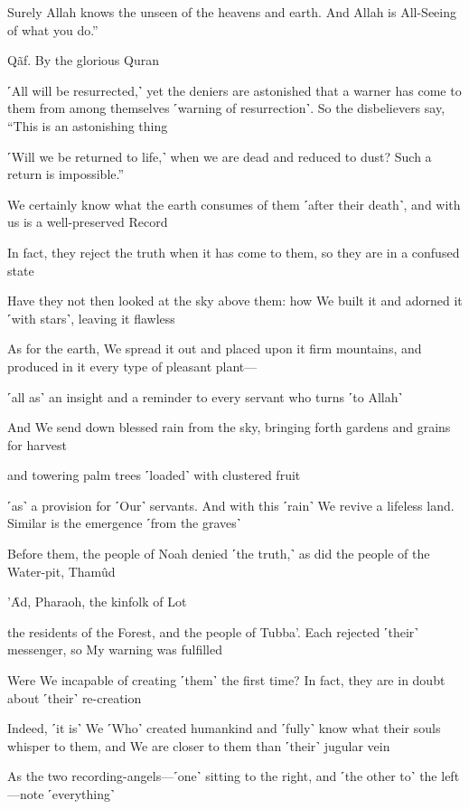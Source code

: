 Surely Allah knows the unseen of the heavens and earth. And Allah is All-Seeing of what you do.”

Qãf. By the glorious Quran

˹All will be resurrected,˺ yet the deniers are astonished that a warner has come to them from among themselves ˹warning of resurrection˺. So the disbelievers say, “This is an astonishing thing

˹Will we be returned to life,˺ when we are dead and reduced to dust? Such a return is impossible.”

We certainly know what the earth consumes of them ˹after their death˺, and with us is a well-preserved Record

In fact, they reject the truth when it has come to them, so they are in a confused state

Have they not then looked at the sky above them: how We built it and adorned it ˹with stars˺, leaving it flawless

As for the earth, We spread it out and placed upon it firm mountains, and produced in it every type of pleasant plant—

˹all as˺ an insight and a reminder to every servant who turns ˹to Allah˺

And We send down blessed rain from the sky, bringing forth gardens and grains for harvest

and towering palm trees ˹loaded˺ with clustered fruit

˹as˺ a provision for ˹Our˺ servants. And with this ˹rain˺ We revive a lifeless land. Similar is the emergence ˹from the graves˺

Before them, the people of Noah denied ˹the truth,˺ as did the people of the Water-pit, Thamûd

’Ȃd, Pharaoh, the kinfolk of Lot

the residents of the Forest, and the people of Tubba’. Each rejected ˹their˺ messenger, so My warning was fulfilled

Were We incapable of creating ˹them˺ the first time? In fact, they are in doubt about ˹their˺ re-creation

Indeed, ˹it is˺ We ˹Who˺ created humankind and ˹fully˺ know what their souls whisper to them, and We are closer to them than ˹their˺ jugular vein

As the two recording-angels—˹one˺ sitting to the right, and ˹the other to˺ the left—note ˹everything˺

